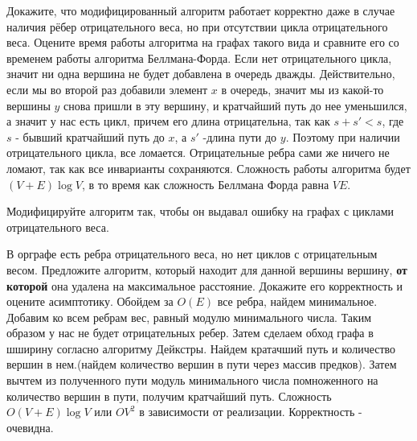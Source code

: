 \documentclass[12pt]{extreport}
\theoremstyle{definiton}
\theoremstyle{definition}
\theoremstyle{definition}
\newcounter{problem}
\newcounter{subproblem}
\newcounter{subrproblem}
\def\prsub{\medskip\noindent\stepcounter{subproblem}\setcounter{subrproblem}{0}{\sf \thesubproblem .}\;}
\def\prend{
	\bigskip
}
\begin{document}
	\prsub Докажите, что модифицированный алгоритм работает корректно даже в случае наличия рёбер отрицательного веса, но при отсутствии цикла отрицательного веса. Оцените время работы алгоритма на графах такого вида и сравните его со временем работы алгоритма Беллмана-Форда.
	\newline
	Если нет отрицательного цикла, значит ни одна вершина не будет добавлена в очередь дважды. Действительно, если мы во второй раз добавили элемент $x$ в очередь, значит мы из какой-то вершины $y$ снова пришли в эту вершину, и кратчайший путь до нее уменьшился, а значит у нас есть цикл, причем его длина отрицательна, так как $s+s' < s$, где $s$ - бывший кратчайший путь до $x$, а $s'$ -длина пути до $y$. Поэтому при наличии отрицательного цикла, все ломается. Отрицательные ребра сами же ничего не ломают, так как все инварианты сохраняются.
	Сложность работы алгоритма будет $(V+E)\log V$, в то время как сложность Беллмана Форда равна $VE$.

	\prsub Модифицируйте алгоритм так, чтобы он выдавал ошибку на графах с циклами отрицательного веса.
	\prend
	


	



	\Pr[3] В орграфе есть ребра отрицательного веса, но нет циклов с отрицательным весом. Предложите алгоритм, который находит для данной вершины вершину, \textbf{от которой} она удалена на максимальное расстояние. Докажите его корректность и оцените асимптотику.
    \newline
    Обойдем за $O(E)$ все ребра, найдем минимальное. Добавим ко всем ребрам вес, равный модулю минимального числа. Таким образом у нас не будет отрицательных ребер. Затем сделаем обход графа в шширину согласно алгоритму Дейкстры. Найдем кратачший путь и количество вершин в нем.(найдем количество вершин в пути через массив предков). Затем вычтем из полученного пути модуль минимального числа помноженного на количество вершин в пути, получим кратчайший путь.
    Сложность $O(V+E)\log V$ или $OV^2$ в зависимости от реализации. Корректность - очевидна.
	\prend
\end{document}
